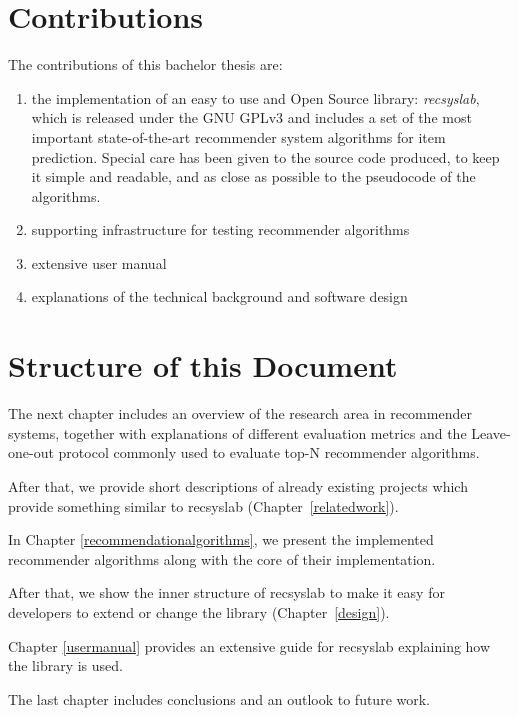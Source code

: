 \section{Contributions}
The contributions of this bachelor thesis are:
\begin{enumerate}
    \item the implementation of an easy to use and Open Source library: \textit{recsyslab}, which is released under the GNU GPLv3\cite{gpl} and includes a set of the most important state-of-the-art recommender system algorithms for item prediction. Special care has been given to the source code produced, to keep it simple and readable, and as close as possible to the pseudocode of the algorithms.
    \item supporting infrastructure for testing recommender algorithms
    \item extensive user manual
    \item explanations of the technical background and software design
\end{enumerate}


\section{Structure of this Document}
The next chapter includes an overview of the research area in recommender systems,
together with explanations of different evaluation metrics and the Leave-one-out
protocol commonly used to evaluate top-N recommender algorithms.

After that, we provide short descriptions of already existing 
projects which provide something similar to recsyslab (Chapter~\ref{relatedwork}).

In Chapter \ref{recommendationalgorithms}, we present the implemented recommender
algorithms along with the core of their implementation. 

After that, we show the inner structure of recsyslab
to make it easy for developers to extend or change the library (Chapter~\ref{design}).

Chapter \ref{usermanual} provides an extensive guide for recsyslab explaining
how the library is used.

The last chapter includes conclusions and an outlook to future work.

